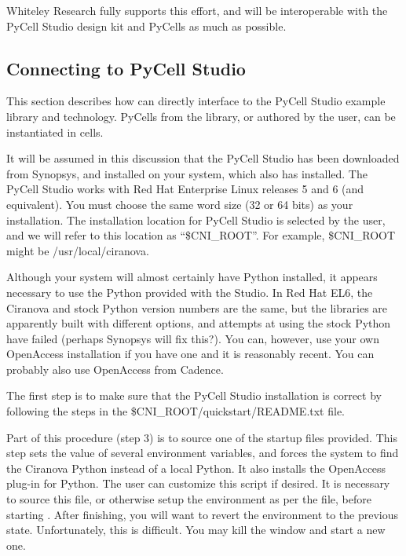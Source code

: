 Whiteley Research fully supports this effort, and {\Xic} will be
interoperable with the PyCell Studio design kit and PyCells as much as
possible.

\subsection{Connecting to PyCell Studio}

This section describes how {\Xic} can directly interface to the PyCell
Studio example library and technology.  PyCells from the library, or
authored by the user, can be instantiated in {\Xic} cells.

It will be assumed in this discussion that the PyCell Studio has been
downloaded from Synopsys, and installed on your system, which also has
{\Xic} installed.  The PyCell Studio works with Red Hat Enterprise
Linux releases 5 and 6 (and equivalent).  You must choose the same
word size (32 or 64 bits) as your {\Xic} installation.  The
installation location for PyCell Studio is selected by the user, and
we will refer to this location as ``{\vt \$CNI\_ROOT}''.  For example,
{\vt \$CNI\_ROOT} might be {\vt /usr/local/ciranova}.

Although your system will almost certainly have Python installed, it
appears necessary to use the Python provided with the Studio.  In Red
Hat EL6, the Ciranova and stock Python version numbers are the same,
but the libraries are apparently built with different options, and
attempts at using the stock Python have failed (perhaps Synopsys will
fix this?).  You can, however, use your own OpenAccess installation if
you have one and it is reasonably recent.  You can probably also use
OpenAccess from Cadence.

The first step is to make sure that the PyCell Studio installation is
correct by following the steps in the {\vt
\$CNI\_ROOT/quickstart/README.txt} file.

Part of this procedure (step 3) is to source one of the startup files
provided.  This step sets the value of several environment variables,
and forces the system to find the Ciranova Python instead of a local
Python.  It also installs the OpenAccess plug-in for Python.  The user
can customize this script if desired.  It is necessary to source this
file, or otherwise setup the environment as per the file, before
starting {\Xic}.  After finishing, you will want to revert the
environment to the previous state.  Unfortunately, this is difficult. 
You may kill the window and start a new one.

